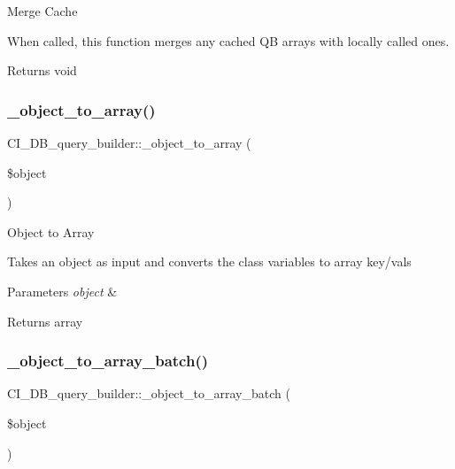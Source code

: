 Merge Cache

When called, this function merges any cached QB arrays with locally called ones.

\begin{DoxyReturn}{Returns}
void 
\end{DoxyReturn}
\mbox{\label{class_c_i___d_b__query__builder_af9ea4bd5669fa28727e491dc722fba63}} 
\subsubsection{\texorpdfstring{\+\_\+object\+\_\+to\+\_\+array()}{\_object\_to\_array()}}
{\footnotesize\ttfamily C\+I\+\_\+\+D\+B\+\_\+query\+\_\+builder\+::\+\_\+object\+\_\+to\+\_\+array (\begin{DoxyParamCaption}\item[{}]{\$object }\end{DoxyParamCaption})\hspace{0.3cm}{\ttfamily [protected]}}

Object to Array

Takes an object as input and converts the class variables to array key/vals


\begin{DoxyParams}{Parameters}
{\em object} & \\
\hline
\end{DoxyParams}
\begin{DoxyReturn}{Returns}
array 
\end{DoxyReturn}
\mbox{\label{class_c_i___d_b__query__builder_aaf29364a6055eec0b3c0486e1de63d2e}} 
\subsubsection{\texorpdfstring{\+\_\+object\+\_\+to\+\_\+array\+\_\+batch()}{\_object\_to\_array\_batch()}}
{\footnotesize\ttfamily C\+I\+\_\+\+D\+B\+\_\+query\+\_\+builder\+::\+\_\+object\+\_\+to\+\_\+array\+\_\+batch (\begin{DoxyParamCaption}\item[{}]{\$object }\end{DoxyParamCaption})\hspace{0.3cm}{\ttfamily [protected]}}

